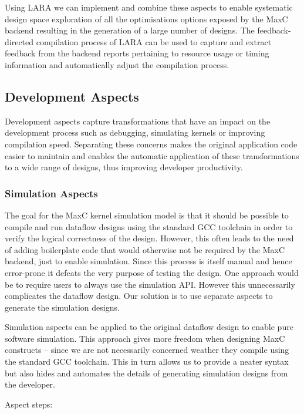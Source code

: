 Using LARA we can implement and combine these aspects to enable
systematic design space exploration of all the optimisations options
exposed by the MaxC backend resulting in the generation of a large
number of designs. The feedback-directed compilation process of LARA can
be used to capture and extract feedback from the backend reports
pertaining to resource usage or timing information and automatically
adjust the compilation process.

\subsection{Development Aspects}

Development aspects capture transformations that have an impact on the
development process such as debugging, simulating kernels or improving
compilation speed. Separating these concerns makes the original
application code easier to maintain and enables the automatic
application of these transformations to a wide range of designs, thus
improving developer productivity.

\subsubsection{Simulation Aspects}

The goal for the MaxC kernel simulation model is that it should be
possible to compile and run dataflow designs using the standard GCC
toolchain in order to verify the logical correctness of the
design. However, this often leads to the need of adding boilerplate
code that would otherwise not be required by the MaxC backend, just to
enable simulation. Since this process is itself manual and hence
error-prone it defeats the very purpose of testing the design. One
approach would be to require users to always use the simulation
API. However this unnecessarily complicates the dataflow design. Our
solution is to use separate aspects to generate the simulation
designs.

Simulation aspects can be applied to the original dataflow design to
enable pure software simulation. This approach gives more freedom when
designing MaxC constructs -- since we are not necessarily concerned
weather they compile using the standard GCC toolchain. This in turn
allows us to provide a neater syntax but also hides and automates the
details of generating simulation designs from the developer.

Aspect steps:

